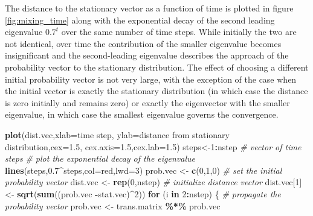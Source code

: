 \documentclass[
]{book}
\newenvironment{Shaded}{\begin{snugshade}}{\end{snugshade}}
\newcommand{\CommentTok}[1]{\textcolor[rgb]{0.56,0.35,0.01}{\textit{#1}}}
\newcommand{\ControlFlowTok}[1]{\textcolor[rgb]{0.13,0.29,0.53}{\textbf{#1}}}
\newcommand{\DataTypeTok}[1]{\textcolor[rgb]{0.13,0.29,0.53}{#1}}
\newcommand{\DecValTok}[1]{\textcolor[rgb]{0.00,0.00,0.81}{#1}}
\newcommand{\FloatTok}[1]{\textcolor[rgb]{0.00,0.00,0.81}{#1}}
\newcommand{\KeywordTok}[1]{\textcolor[rgb]{0.13,0.29,0.53}{\textbf{#1}}}
\newcommand{\NormalTok}[1]{#1}
\newcommand{\OperatorTok}[1]{\textcolor[rgb]{0.81,0.36,0.00}{\textbf{#1}}}
\newcommand{\StringTok}[1]{\textcolor[rgb]{0.31,0.60,0.02}{#1}}
\theoremstyle{definition}
\theoremstyle{definition}
\theoremstyle{definition}
\theoremstyle{remark}
\begin{document}
The distance to the stationary vector as a function of time is plotted in figure \ref{fig:mixing_time} along with the exponential decay of the second leading eigenvalue \(0.7^t\) over the same number of time steps. While initially the two are not identical, over time the contribution of the smaller eigenvalue becomes insignificant and the second-leading eigenvalue describes the approach of the probability vector to the stationary distribution. The effect of choosing a different initial probability vector is not very large, with the exception of the case when the initial vector is exactly the stationary distribution (in which case the distance is zero initially and remains zero) or exactly the eigenvector with the smaller eigenvalue, in which case the smallest eigenvalue governs the convergence.

\begin{Shaded}
\begin{Highlighting}[]
\KeywordTok{plot}\NormalTok{(dist.vec,}\DataTypeTok{xlab=}\StringTok{\textquotesingle{}time step\textquotesingle{}}\NormalTok{, }\DataTypeTok{ylab=}\StringTok{\textquotesingle{}distance from stationary distribution\textquotesingle{}}\NormalTok{,}\DataTypeTok{cex=}\FloatTok{1.5}\NormalTok{, }\DataTypeTok{cex.axis=}\FloatTok{1.5}\NormalTok{,}\DataTypeTok{cex.lab=}\FloatTok{1.5}\NormalTok{)}
\NormalTok{steps\textless{}{-}}\DecValTok{1}\OperatorTok{:}\NormalTok{nstep }\CommentTok{\# vector of time steps }
\CommentTok{\# plot the exponential decay of the eigenvalue}
\KeywordTok{lines}\NormalTok{(steps,}\FloatTok{0.7}\OperatorTok{\^{}}\NormalTok{steps,}\DataTypeTok{col=}\StringTok{\textquotesingle{}red\textquotesingle{}}\NormalTok{,}\DataTypeTok{lwd=}\DecValTok{3}\NormalTok{) }
\NormalTok{prob.vec \textless{}{-}}\StringTok{ }\KeywordTok{c}\NormalTok{(}\DecValTok{0}\NormalTok{,}\DecValTok{1}\NormalTok{,}\DecValTok{0}\NormalTok{) }\CommentTok{\# set the initial probability vector}
\NormalTok{dist.vec \textless{}{-}}\StringTok{ }\KeywordTok{rep}\NormalTok{(}\DecValTok{0}\NormalTok{,nstep) }\CommentTok{\# initialize distance vector}
\NormalTok{dist.vec[}\DecValTok{1}\NormalTok{] \textless{}{-}}\StringTok{ }\KeywordTok{sqrt}\NormalTok{(}\KeywordTok{sum}\NormalTok{((prob.vec }\OperatorTok{{-}}\NormalTok{stat.vec)}\OperatorTok{\^{}}\DecValTok{2}\NormalTok{))}
\ControlFlowTok{for}\NormalTok{ (i }\ControlFlowTok{in} \DecValTok{2}\OperatorTok{:}\NormalTok{nstep) \{ }\CommentTok{\# propagate the probability vector}
\NormalTok{  prob.vec \textless{}{-}}\StringTok{ }\NormalTok{trans.matrix }\OperatorTok{\%*\%}\StringTok{ }\NormalTok{prob.vec}

\end{Highlighting}
\end{Shaded}
\end{document}
